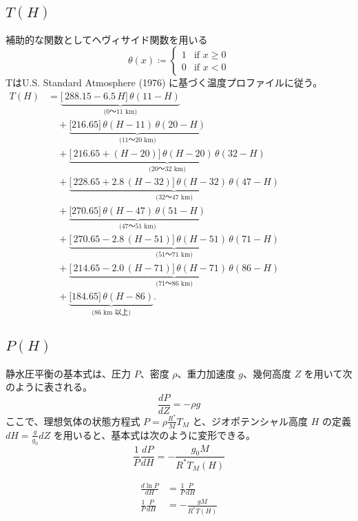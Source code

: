 \documentclass[a4paper,12pt]{article}
\begin{document}
\subsection{\texorpdfstring{$T(H)$}{Temp}}
補助的な関数としてヘヴィサイド関数を用いる
$$
\theta(x) \coloneq\left\{
  \begin{array}{ll}
    1 & \text{if } x \geq 0 \\
    0 & \text{if } x < 0
  \end{array}
\right.
$$
TはU.S. Standard Atmosphere (1976) に基づく温度プロファイルに従う。\\
$\begin{aligned}
T(H)
&=
\underbrace{\bigl[\,288.15 - 6.5\,H\bigr]\,
\theta(11 - H)}_{\text{(0～11 km)}} \\[6pt]
&\quad{}+ 
\underbrace{\bigl[216.65\bigr] \,
\theta(H - 11)\,\theta(20 - H)}_{\text{(11～20 km)}} \\[6pt]
&\quad{}+
\underbrace{\bigl[\,216.65 + (H - 20)\bigr]\,
\theta(H - 20)\,\theta(32 - H)}_{\text{(20～32 km)}} \\[6pt]
&\quad{}+
\underbrace{\bigl[\,228.65 + 2.8\,(H - 32)\bigr]\,
\theta(H - 32)\,\theta(47 - H)}_{\text{(32～47 km)}} \\[6pt]
&\quad{}+
\underbrace{\bigl[270.65\bigr] \,
\theta(H - 47)\,\theta(51 - H)}_{\text{(47～51 km)}} \\[6pt]
&\quad{}+
\underbrace{\bigl[\,270.65 - 2.8\,(H - 51)\bigr]\,
\theta(H - 51)\,\theta(71 - H)}_{\text{(51～71 km)}} \\[6pt]
&\quad{}+
\underbrace{\bigl[\,214.65 - 2.0\,(H - 71)\bigr]\,
\theta(H - 71)\,\theta(86 - H)}_{\text{(71～86 km)}} \\[6pt]
&\quad{}+
\underbrace{\bigl[184.65\bigr] \,
\theta(H - 86)}_{\text{(86 km 以上)}}.
\end{aligned}$

\subsection{\texorpdfstring{$P(H)$}{Pressure}}

静水圧平衡の基本式は、圧力 $P$、密度 $\rho$、重力加速度 $g$、幾何高度 $Z$ を用いて次のように表される。
\[
\frac{dP}{dZ} = - \rho g
\]
ここで、理想気体の状態方程式 $P = \rho \frac{R^*}{M} T_M$ と、ジオポテンシャル高度 $H$ の定義 $dH = \frac{g}{g_0} dZ$ を用いると、基本式は次のように変形できる。
\[
\frac{1}{P}\frac{dP}{dH} = -\frac{g_0 M}{R^*T_M(H)}
\]

\begin{align*}
\frac{d\ln P}{dH} &= \frac{1}{P}\frac{P}{dH}\\
\frac{1}{P}\frac{P}{dH} &= -\frac{gM}{R^*T(H)}\\
\end{align*}
\end{document}

